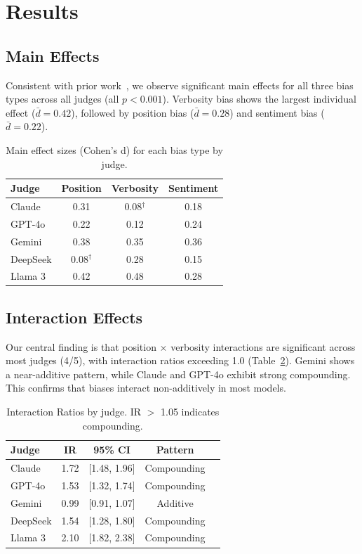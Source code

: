 \documentclass[11pt,twocolumn]{article}
\begin{document}
\section{Results}
\label{sec:results}

\subsection{Main Effects}
Consistent with prior work~\citep{yang2025reliable}, we observe significant main effects for all three bias types across all judges (all $p < 0.001$). Verbosity bias shows the largest individual effect ($\bar{d} = 0.42$), followed by position bias ($\bar{d} = 0.28$) and sentiment bias ($\bar{d} = 0.22$).

\begin{table}[h]
\centering
\caption{Main effect sizes (Cohen's d) for each bias type by judge.}
\label{tab:main_effects}
\begin{tabular}{lccc}
\toprule
Judge & Position & Verbosity & Sentiment \\
\midrule
Claude & 0.31 & 0.08$^\dagger$ & 0.18 \\
GPT-4o & 0.22 & 0.12 & 0.24 \\
Gemini & 0.38 & 0.35 & 0.36 \\
DeepSeek & 0.08$^\dagger$ & 0.28 & 0.15 \\
Llama 3 & 0.42 & 0.48 & 0.28 \\
\bottomrule
\end{tabular}
\end{table}

\subsection{Interaction Effects}
Our central finding is that position $\times$ verbosity interactions are significant across most judges (4/5), with interaction ratios exceeding 1.0 (Table~\ref{tab:interactions}). Gemini shows a near-additive pattern, while Claude and GPT-4o exhibit strong compounding. This confirms that biases interact non-additively in most models.

\begin{table}[h]
\centering
\caption{Interaction Ratios by judge. IR $>$ 1.05 indicates compounding.}
\label{tab:interactions}
\begin{tabular}{lcccc}
\toprule
Judge & IR & 95\% CI & Pattern \\
\midrule
Claude & 1.72 & [1.48, 1.96] & Compounding \\
GPT-4o & 1.53 & [1.32, 1.74] & Compounding \\
Gemini & 0.99 & [0.91, 1.07] & Additive \\
DeepSeek & 1.54 & [1.28, 1.80] & Compounding \\
Llama 3 & 2.10 & [1.82, 2.38] & Compounding \\
\bottomrule
\end{tabular}
\end{table}
\end{document}
